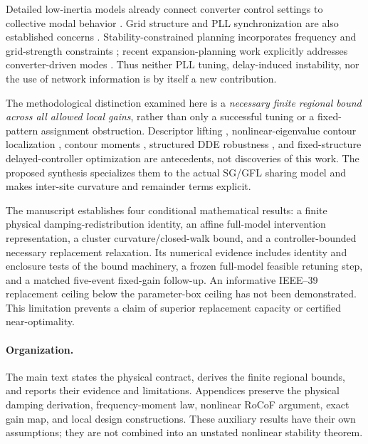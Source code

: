 \documentclass[11pt]{article}
\begin{document}
Detailed low-inertia models already connect converter control settings
to collective modal behavior \cite{markovic}. Grid structure and PLL
synchronization are also established concerns \cite{huang}.
Stability-constrained planning incorporates frequency and grid-strength
constraints \cite{chuteng}; recent expansion-planning work explicitly
addresses converter-driven modes \cite{jia}. Thus neither PLL tuning,
delay-induced instability, nor the use of network information is by
itself a new contribution.

The methodological distinction examined here is a \emph{necessary
finite regional bound across all allowed local gains}, rather than
only a successful tuning or a fixed-pattern assignment obstruction.
Descriptor lifting \cite{peaucelle}, nonlinear-eigenvalue contour
localization \cite{bindel}, contour moments \cite{beyn}, structured
DDE robustness \cite{borgioli}, and fixed-structure delayed-controller
optimization \cite{michielsdesign} are antecedents, not discoveries
of this work. The proposed synthesis specializes them to the actual
SG/GFL sharing model and makes inter-site curvature and remainder
terms explicit.

The manuscript establishes four conditional mathematical results:
a finite physical damping-redistribution identity, an affine full-model
intervention representation, a cluster curvature/closed-walk bound,
and a controller-bounded necessary replacement relaxation. Its numerical evidence includes identity and enclosure tests of the
bound machinery, a frozen full-model feasible retuning step, and a
matched five-event fixed-gain follow-up. An informative
IEEE--39 replacement ceiling below the parameter-box ceiling has not
been demonstrated. This limitation prevents a claim of superior
replacement capacity or certified near-optimality.

\paragraph{Organization.}
The main text states the physical contract, derives the finite
regional bounds, and reports their evidence and limitations.
Appendices preserve the physical damping derivation, frequency-moment
law, nonlinear RoCoF argument, exact gain map, and local design
constructions. These auxiliary results have their own assumptions;
they are not combined into an unstated nonlinear stability theorem.
\end{document}
